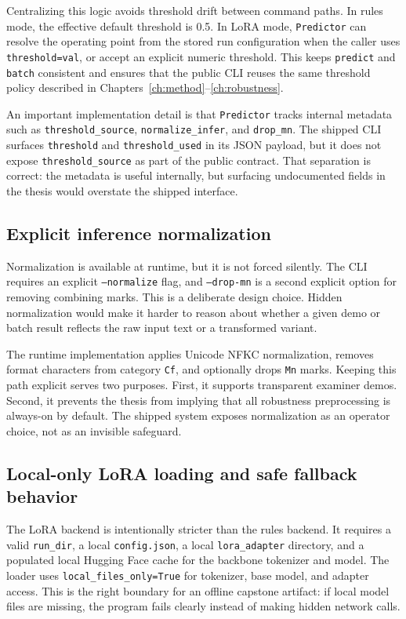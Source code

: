 Centralizing this logic avoids threshold drift between command paths. In rules mode, the effective default threshold is 0.5. In LoRA mode, \texttt{Predictor} can resolve the operating point from the stored run configuration when the caller uses \texttt{threshold=val}, or accept an explicit numeric threshold. This keeps \texttt{predict} and \texttt{batch} consistent and ensures that the public CLI reuses the same threshold policy described in Chapters~\ref{ch:method}--\ref{ch:robustness}.

An important implementation detail is that \texttt{Predictor} tracks internal metadata such as \texttt{threshold\_source}, \texttt{normalize\_infer}, and \texttt{drop\_mn}. The shipped CLI surfaces \texttt{threshold} and \texttt{threshold\_used} in its JSON payload, but it does not expose \texttt{threshold\_source} as part of the public contract. That separation is correct: the metadata is useful internally, but surfacing undocumented fields in the thesis would overstate the shipped interface.

\subsection{Explicit inference normalization}

Normalization is available at runtime, but it is not forced silently. The CLI requires an explicit \texttt{--normalize} flag, and \texttt{--drop-mn} is a second explicit option for removing combining marks. This is a deliberate design choice. Hidden normalization would make it harder to reason about whether a given demo or batch result reflects the raw input text or a transformed variant.

The runtime implementation applies Unicode NFKC normalization, removes format characters from category \texttt{Cf}, and optionally drops \texttt{Mn} marks. Keeping this path explicit serves two purposes. First, it supports transparent examiner demos. Second, it prevents the thesis from implying that all robustness preprocessing is always-on by default. The shipped system exposes normalization as an operator choice, not as an invisible safeguard.

\subsection{Local-only LoRA loading and safe fallback behavior}

The LoRA backend is intentionally stricter than the rules backend. It requires a valid \texttt{run\_dir}, a local \texttt{config.json}, a local \texttt{lora\_adapter} directory, and a populated local Hugging Face cache for the backbone tokenizer and model. The loader uses \texttt{local\_files\_only=True} for tokenizer, base model, and adapter access. This is the right boundary for an offline capstone artifact: if local model files are missing, the program fails clearly instead of making hidden network calls.

